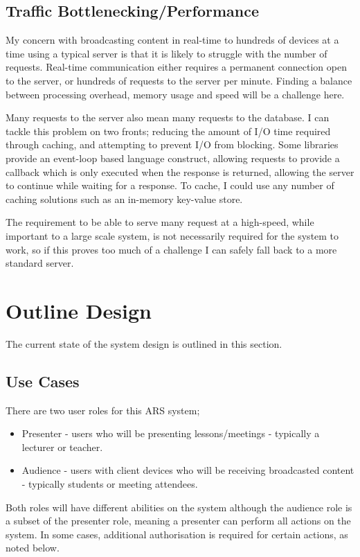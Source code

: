 \documentclass[a4papert,11pt,notitlepage]{ltxdoc}
\begin{document}
\subsection{Traffic Bottlenecking/Performance}
\label{sec:performance}
My concern with broadcasting content in real-time to hundreds of devices at a time using a typical server is that it is likely to struggle with the number of requests. Real-time communication either requires a permanent connection open to the server, or hundreds of requests to the server per minute. Finding a balance between processing overhead, memory usage and speed will be a challenge here.

Many requests to the server also mean many requests to the database. I can tackle this problem on two fronts; reducing the amount of I/O time required through caching, and attempting to prevent I/O from blocking. Some libraries provide an event-loop based language construct, allowing requests to provide a callback which is only executed when the response is returned, allowing the server to continue while waiting for a response. To cache, I could use any number of caching solutions such as an in-memory key-value store.

The requirement to be able to serve many request at a high-speed, while important to a large scale system, is not necessarily required for the system to work, so if this proves too much of a challenge I can safely fall back to a more standard server.

\section{Outline Design}
The current state of the system design is outlined in this section.

\subsection{Use Cases}
There are two user roles for this ARS system;
\begin{itemize}
\item Presenter - users who will be presenting lessons/meetings - typically a lecturer or teacher.
\item Audience - users with client devices who will be receiving broadcasted content - typically students or meeting attendees.
\end{itemize}

Both roles will have different abilities on the system although the audience role is a subset of the presenter role, meaning a presenter can perform all actions on the system. In some cases, additional authorisation is required for certain actions, as noted below.
\end{document}
